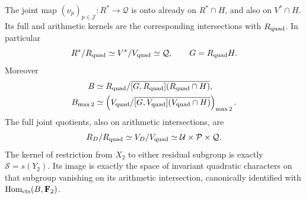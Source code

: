\begin{theorem}\label{thm:complete-quadratic-normalization}
The joint map \((\nu_p)_{p\in\mathcal J}:R^*\to\mathcal Q\)
is onto already on \(R^*\cap H\), and also on \(V^*\cap H\).
Its full and arithmetic kernels are the corresponding intersections
with \(R_{\rm quad}\). In particular
\[
 R^*/R_{\rm quad}\simeq V^*/V_{\rm quad}\simeq\mathcal Q,
 \qquad G=R_{\rm quad}H.
\]
Moreover
\[
 \begin{aligned}
 B&\simeq R_{\rm quad}/
            \overline{[G,R_{\rm quad}](R_{\rm quad}\cap H)},\\
 B_{\max2}&\simeq
 \left(V_{\rm quad}/
            \overline{[G,V_{\rm quad}](V_{\rm quad}\cap H)}\right)_{\max2}.
 \end{aligned}
\]
The full joint quotients, also on arithmetic intersections, are
\[
 R_D/R_{\rm quad}\simeq V_D/V_{\rm quad}
       \simeq\mathcal U\times\mathcal P\times\mathcal Q.
\]
The kernel of restriction from \(X_2\) to either residual subgroup
is exactly \(\mathcal S=s(Y_2)\). Its image is exactly the space
of invariant quadratic characters on that subgroup vanishing on
its arithmetic intersection, canonically identified with
\(\operatorname{Hom}_{\rm cts}(B,\mathbf F_2)\).
\end{theorem}
